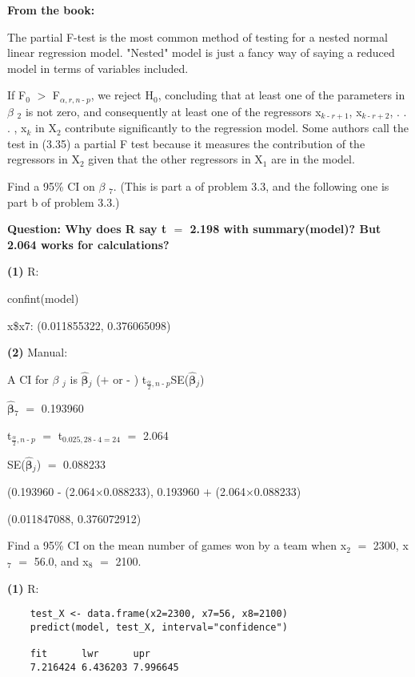 \documentclass{article}
\newcommand{\mt}[1]{\ensuremath{#1}}
\newcommand{\bpth}[1]{\textbf{(#1)}}
\newcommand{\afa}{\mt{\alpha} }
\newcommand{\bta}{\mt{\beta} }
\newcommand{\ps}{\mt{\operatorname{+}} }
\newcommand{\ms}{\mt{\operatorname{-}} }
\newcommand{\gr}{\mt{\operatorname{>}} }
\newcommand{\eql}{ \mt{\operatorname{=}} }
\newcommand{\uw}[2]{#1\mt{_{#2}}}
\newcommand{\frc}[2]{\mt{\frac{#1}{#2}}}
\newcommand{\bh}[1]{\mathbf{\hat{\text{$#1$}}}}
\newcommand{\bth}{\mt{\bh{\beta}}}
\begin{document}
{	\textbf{From the book:} 
	
	The partial F-test is the most common method of testing for a nested normal linear regression model. "Nested" model is just a fancy way of saying a reduced model in terms of variables included.
	
	If \uw{F}{0} \gr \uw{F}{\afa, r, n \ms p}, we reject \uw{H}{0}, concluding that at least one of the parameters in \uw{\bta}{2} is not zero, and consequently at least one of the regressors \uw{x}{k \ms r \ps 1}, \uw{x}{k \ms r \ps 2}, . . . , \uw{x}{k} in \uw{X}{2} contribute significantly to the regression model. Some authors call the test in (3.35) a partial F test because it measures the contribution of the regressors in \uw{X}{2} given that the other regressors in \uw{X}{1} are in the model.		
	
\item Find a 95\% CI on \uw{\bta}{7}. (This is part a of problem 3.3, and the following one is part b of problem 3.3.)
	
	\textbf{Question: Why does R say t \eql 2.198 with summary(model)? But 2.064 works for calculations?}
	
	\bpth{1} R:
	
	confint(model)
	
	x\$x7: (0.011855322, 0.376065098)
	
	\bpth{2} Manual:
	
	A CI for \uw{\bta}{j} is \uw{\bth}{j} (\ps or \ms) \uw{t}{\frc{\afa}{2}, n \ms p}SE(\uw{\bth}{j})
	
	\uw{\bth}{7} \eql 0.193960
	
	\uw{t}{\frc{\afa}{2}, n \ms p} \eql \uw{t}{0.025, 28 \ms 4 \eql 24} \eql 2.064
	
	SE(\uw{\bth}{j}) \eql 0.088233
	
	(0.193960 \ms (2.064$\times$0.088233), 0.193960 \ps (2.064$\times$0.088233)
	
	(0.011847088, 0.376072912)
	
\item Find a 95\% CI on the mean number of games won by a team when \uw{x}{2} \eql 2300, \uw{x}{7} \eql 56.0, and \uw{x}{8} \eql 2100.
	
	
	\bpth{1} R:
\begin{verbatim}
	test_X <- data.frame(x2=2300, x7=56, x8=2100)
	predict(model, test_X, interval="confidence")
	
	fit      lwr      upr
	7.216424 6.436203 7.996645
\end{verbatim}

}
\end{document}
